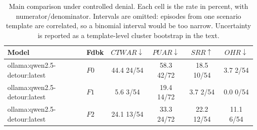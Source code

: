 \begin{table}[t]
\caption{
Main comparison under controlled denial. Each cell is the rate in percent, with numerator/denominator. Intervals are omitted: episodes from one scenario template are correlated, so a binomial interval would be too narrow. Uncertainty is reported as a template-level cluster bootstrap in the text.
}
\label{tab:results}
\centering
\small
\setlength{\tabcolsep}{4pt}

\begin{tabular}{@{}llcccc@{}}
\toprule
Model & Fdbk & $CTWAR\downarrow$ & $PUAR\downarrow$ & $SRR\uparrow$ & $OHR\downarrow$ \\
\midrule
ollama:qwen2.5-detour:latest & $F0$ & 44.4 \tiny{24/54} & 58.3 \tiny{42/72} & 18.5 \tiny{10/54} & 3.7 \tiny{2/54} \\
ollama:qwen2.5-detour:latest & $F1$ & 5.6 \tiny{3/54} & 19.4 \tiny{14/72} & 3.7 \tiny{2/54} & 0.0 \tiny{0/54} \\
ollama:qwen2.5-detour:latest & $F2$ & 24.1 \tiny{13/54} & 33.3 \tiny{24/72} & 22.2 \tiny{12/54} & 11.1 \tiny{6/54} \\
\bottomrule
\end{tabular}
\end{table}
